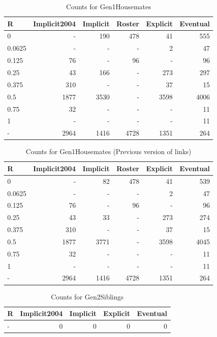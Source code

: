 \documentclass[a4paper]{article}\usepackage[]{graphicx}\usepackage[]{color}
\begin{document}
\begin{table}[ht]
\centering
{\large
\begin{tabular}{lrrrrr}
  \hline
R & Implicit2004 & Implicit & Roster & Explicit & Eventual \\ 
  \hline
0 & - & 190 & 478 &  41 & 555 \\ 
  0.0625 & - & - & - &   2 &  47 \\ 
  0.125 &  76 & - &  96 & - &  96 \\ 
  0.25 &  43 & 166 & - & 273 & 297 \\ 
  0.375 & 310 & - & - &  37 &  15 \\ 
  0.5 & 1877 & 3530 & - & 3598 & 4006 \\ 
  0.75 &  32 & - & - & - &  11 \\ 
  1 & - & - & - & - &  11 \\ 
  - & 2964 & 1416 & 4728 & 1351 & 264 \\ 
   \hline
\end{tabular}
}
\caption{Counts for Gen1Housemates} 
\end{table}
\begin{table}[ht]
\centering
{\large
\begin{tabular}{lrrrrr}
  \hline
R & Implicit2004 & Implicit & Roster & Explicit & Eventual \\ 
  \hline
0 & - &  82 & 478 &  41 & 539 \\ 
  0.0625 & - & - & - &   2 &  47 \\ 
  0.125 &  76 & - &  96 & - &  96 \\ 
  0.25 &  43 &  33 & - & 273 & 274 \\ 
  0.375 & 310 & - & - &  37 &  15 \\ 
  0.5 & 1877 & 3771 & - & 3598 & 4045 \\ 
  0.75 &  32 & - & - & - &  11 \\ 
  1 & - & - & - & - &  11 \\ 
  - & 2964 & 1416 & 4728 & 1351 & 264 \\ 
   \hline
\end{tabular}
}
\caption{Counts for Gen1Housemates (Previous version of links)} 
\end{table}
\begin{table}[ht]
\centering
{\large
\begin{tabular}{lrrrr}
  \hline
R & Implicit2004 & Implicit & Explicit & Eventual \\ 
  \hline
- &   0 &   0 &   0 &   0 \\ 
   \hline
\end{tabular}
}
\caption{Counts for Gen2Siblings} 
\end{table}
\end{document}
